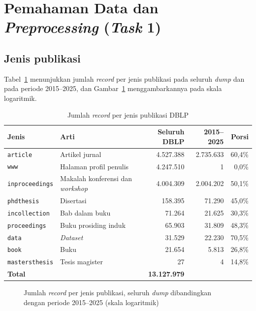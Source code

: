 \section{Pemahaman Data dan \textit{Preprocessing} (\textit{Task} 1)}
\label{sec:hasil-t1}

\subsection{Jenis publikasi}
\label{sec:hasil-jenis}
Tabel~\ref{tab:jenis} menunjukkan jumlah \textit{record} per jenis publikasi pada seluruh \textit{dump} dan pada periode 2015--2025, dan Gambar~\ref{fig:jenis} menggambarkannya pada skala logaritmik.

\begin{table}[ht]
\caption{Jumlah \textit{record} per jenis publikasi DBLP}
\label{tab:jenis}
\small
\begin{tabularx}{\textwidth}{@{}p{3.2cm}>{\raggedright\arraybackslash}X rrr@{}}
\toprule
\textbf{Jenis} & \textbf{Arti} & \textbf{Seluruh DBLP} & \textbf{2015--2025} & \textbf{Porsi} \\
\midrule
\texttt{article} & Artikel jurnal & 4.527.388 & 2.735.633 & 60,4\% \\
\texttt{www} & Halaman profil penulis & 4.247.510 & 1 & 0,0\% \\
\texttt{inproceedings} & Makalah konferensi dan \textit{workshop} & 4.004.309 & 2.004.202 & 50,1\% \\
\texttt{phdthesis} & Disertasi & 158.395 & 71.290 & 45,0\% \\
\texttt{incollection} & Bab dalam buku & 71.264 & 21.625 & 30,3\% \\
\texttt{proceedings} & Buku prosiding induk & 65.903 & 31.809 & 48,3\% \\
\texttt{data} & \textit{Dataset} & 31.529 & 22.230 & 70,5\% \\
\texttt{book} & Buku & 21.654 & 5.813 & 26,8\% \\
\texttt{mastersthesis} & Tesis magister & 27 & 4 & 14,8\% \\
\midrule
\textbf{Total} & & \textbf{13.127.979} & & \\
\bottomrule
\end{tabularx}
\end{table}

\begin{figure}[ht]
\centering
{}
\caption{Jumlah \textit{record} per jenis publikasi, seluruh \textit{dump} dibandingkan dengan periode 2015--2025 (skala logaritmik)}
\label{fig:jenis}
\end{figure}

